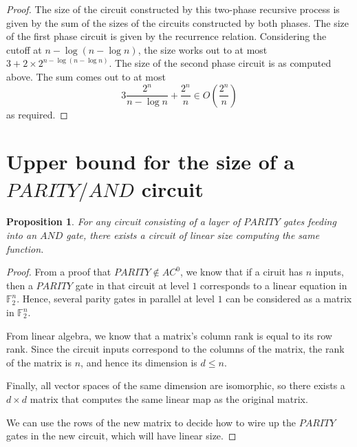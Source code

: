 \documentclass[letterpaper,11pt]{article}
\newtheorem{proposition}{Proposition}
\newcommand{\F}{\mathbb{F}}
\begin{document}
\begin{proof}
    The size of the circuit constructed by this two-phase recursive process is
    given by the sum of the sizes of the circuits constructed by both phases.
    The size of the first phase circuit is given by the recurrence relation.
    Considering the cutoff at $n - \log{(n - \log n)}$, the size works out to
    at most $3 + 2 \times 2^{n - \log{(n - \log n)}}$. The size of the second
    phase circuit is as computed above. The sum comes out to at most
    $$
    3 \frac{2^n}{n - \log n} + \frac{2^n}{n} \in O\left(\frac{2^n}{n}\right)
    $$
    as required.
\end{proof}

\section*{Upper bound for the size of a $PARITY/AND$ circuit}

\begin{proposition}
    For any circuit consisting of a layer of $PARITY$ gates feeding into an
    $AND$ gate, there exists a circuit of linear size computing the same
    function.
\end{proposition}

\begin{proof}
    From a proof that $PARITY \notin AC^0$, we know that if a ciruit has $n$
    inputs, then a $PARITY$ gate in that circuit at level $1$ corresponds to a
    linear equation in $\F_2^n$. Hence, several parity gates in parallel at
    level $1$ can be considered as a matrix in $\F_2^n$.

    From linear algebra, we know that a matrix's column rank is equal to its
    row rank. Since the circuit inputs correspond to the columns of the matrix,
    the rank of the matrix is $n$, and hence its dimension is $d \leq n$.

    Finally, all vector spaces of the same dimension are isomorphic, so there
    exists a $d \times d$ matrix that computes the same linear map as the
    original matrix.

    We can use the rows of the new matrix to decide how to wire up the $PARITY$
    gates in the new circuit, which will have linear size.
\end{proof}
\end{document}
